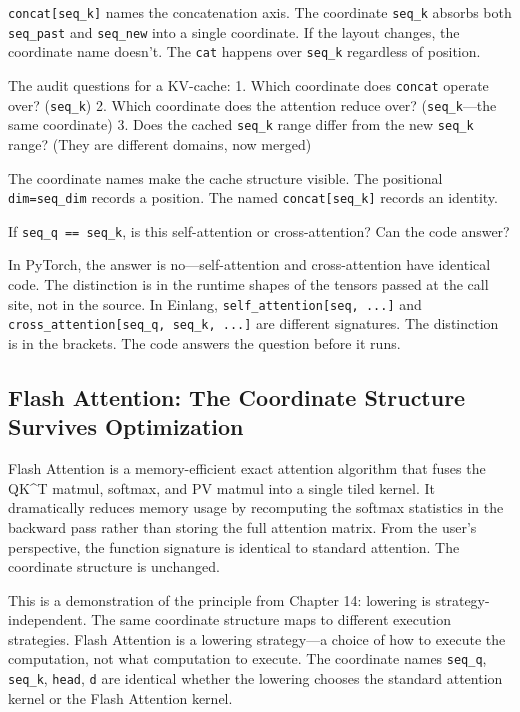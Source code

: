 \documentclass[11pt,titlepage]{article}
\begin{document}
\texttt{concat{[}seq\_k{]}} names the concatenation axis. The coordinate
\texttt{seq\_k} absorbs both \texttt{seq\_past} and \texttt{seq\_new}
into a single coordinate. If the layout changes, the coordinate name
doesn't. The \texttt{cat} happens over \texttt{seq\_k} regardless of
position.

The audit questions for a KV-cache: 1. Which coordinate does
\texttt{concat} operate over? (\texttt{seq\_k}) 2. Which coordinate does
the attention reduce over? (\texttt{seq\_k}---the same coordinate) 3.
Does the cached \texttt{seq\_k} range differ from the new
\texttt{seq\_k} range? (They are different domains, now merged)

The coordinate names make the cache structure visible. The positional
\texttt{dim=seq\_dim} records a position. The named
\texttt{concat{[}seq\_k{]}} records an identity.

\vspace{2em}

If \texttt{seq\_q\ ==\ seq\_k}, is this self-attention or
cross-attention? Can the code answer?

In PyTorch, the answer is no---self-attention and cross-attention have
identical code. The distinction is in the runtime shapes of the tensors
passed at the call site, not in the source. In Einlang,
\texttt{self\_attention{[}seq,\ ...{]}} and
\texttt{cross\_attention{[}seq\_q,\ seq\_k,\ ...{]}} are different
signatures. The distinction is in the brackets. The code answers the
question before it runs.

\vspace{2em}

\hypertarget{flash-attention-the-coordinate-structure-survives-optimization}{%
\subsection{Flash Attention: The Coordinate Structure Survives
Optimization}\label{flash-attention-the-coordinate-structure-survives-optimization}}

Flash Attention is a memory-efficient exact attention algorithm that
fuses the QK\^{}T matmul, softmax, and PV matmul into a single tiled
kernel. It dramatically reduces memory usage by recomputing the softmax
statistics in the backward pass rather than storing the full attention
matrix. From the user's perspective, the function signature is identical
to standard attention. The coordinate structure is unchanged.

This is a demonstration of the principle from Chapter 14: lowering is
strategy-independent. The same coordinate structure maps to different
execution strategies. Flash Attention is a lowering strategy---a choice
of how to execute the computation, not what computation to execute. The
coordinate names \texttt{seq\_q}, \texttt{seq\_k}, \texttt{head},
\texttt{d} are identical whether the lowering chooses the standard
attention kernel or the Flash Attention kernel.
\end{document}
